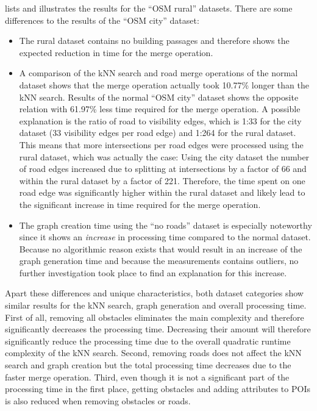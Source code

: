 			\noindent
			 lists and illustrates the results for the \enquote{OSM rural} datasets.
			There are some differences to the results of the \enquote{OSM city} dataset:
			\begin{itemize}
				\item The rural dataset contains no building passages and therefore shows the expected reduction in time for the merge operation.
				\item A comparison of the kNN search and road merge operations of the normal dataset shows that the merge operation actually took 10.77\% longer than the kNN search.
				Results of the normal \enquote{OSM city} dataset shows the opposite relation with 61.97\% less time required for the merge operation.
				A possible explanation is the ratio of road to visibility edges, which is 1:33 for the city dataset (33 visibility edges per road edge) and 1:264 for the rural dataset.
				This means that more intersections per road edges were processed using the rural dataset, which was actually the case:
				Using the city dataset the number of road edges increased due to splitting at intersections by a factor of 66 and within the rural dataset by a factor of 221.
				Therefore, the time spent on one road edge was significantly higher within the rural dataset and likely lead to the significant increase in time required for the merge operation.
				\item The graph creation time using the \enquote{no roads} dataset is especially noteworthy since it shows an \emph{increase} in processing time compared to the normal dataset.
				Because no algorithmic reason exists that would result in an increase of the graph generation time and because the measurements contains outliers, no further investigation took place to find an explanation for this increase.
			\end{itemize}
			Apart these differences and unique characteristics, both dataset categories show similar results for the kNN search, graph generation and overall processing time.
			First of all, removing all obstacles eliminates the main complexity and therefore significantly decreases the processing time.
			Decreasing their amount will therefore significantly reduce the processing time due to the overall quadratic runtime complexity of the kNN search.
			Second, removing roads does not affect the kNN search and graph creation but the total processing time decreases due to the faster merge operation.
			Third, even though it is not a significant part of the processing time in the first place, getting obstacles and adding attributes to POIs is also reduced when removing obstacles or roads.
	
